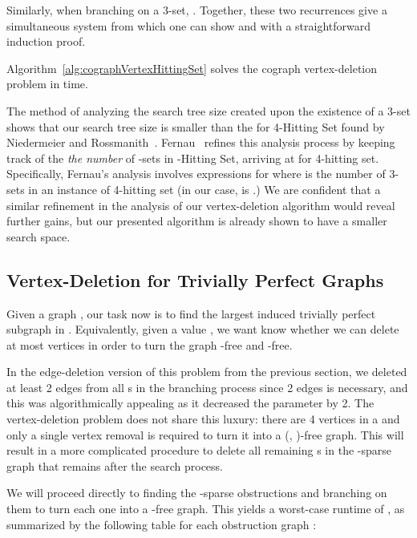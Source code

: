 \documentclass{llncs}
\begin{document}
Similarly, when branching on a 3-set, . Together, these two recurrences give a simultaneous system from which one can show  and  with a straightforward induction proof.

\begin{theorem} Algorithm~\ref{alg:cographVertexHittingSet} solves the cograph vertex-deletion problem in  time.
\end{theorem}

The method of analyzing the search tree size created upon the existence of a 3-set shows that our search tree size is smaller than the  for 4-{\sc Hitting Set} found by Niedermeier and Rossmanith~\cite{NiRo}. Fernau~\cite{Fer} refines this analysis process by keeping track of the \emph{the number} of -sets in -{\sc Hitting Set}, arriving at  for 4-hitting set. Specifically, Fernau's analysis involves expressions  for  where  is the number of 3-sets in an instance of 4-hitting set (in our case,  is .) We are confident that a similar refinement in the analysis of our vertex-deletion algorithm would reveal further gains, but our presented algorithm is already shown to have a smaller search space.

\subsection{Vertex-Deletion for Trivially Perfect Graphs}

Given a graph , our task now is to find the largest induced trivially perfect subgraph in . Equivalently, given a value , we want know whether we can delete at most  vertices in order to turn the graph -free and -free.

In the edge-deletion version of this problem from the previous section, we deleted at least 2 edges from all s in the branching process since 2 edges is necessary, and this was algorithmically appealing as it decreased the parameter by 2. The vertex-deletion problem does not share this luxury: there are 4 vertices in a  and only a single vertex removal is required to turn it into a (, )-free graph. This will result in a more complicated procedure to delete all remaining s in the -sparse graph that remains after the search process.

We will proceed directly to finding the -sparse obstructions and branching on them to turn each one into a -free graph. This yields a worst-case runtime of , as summarized by the following table for each obstruction graph :
\end{document}
